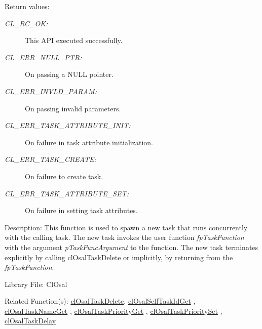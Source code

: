 \begin{Desc}
\item[Return values:]
\begin{description}
\item[{\em CL\_\-RC\_\-OK:}]This API executed successfully. \item[{\em CL\_\-ERR\_\-NULL\_\-PTR:}]On passing a NULL pointer. \item[{\em CL\_\-ERR\_\-INVLD\_\-PARAM:}]On passing invalid parameters. \item[{\em CL\_\-ERR\_\-TASK\_\-ATTRIBUTE\_\-INIT:}]On failure in task attribute initialization. \item[{\em CL\_\-ERR\_\-TASK\_\-CREATE:}]On failure to create task. \item[{\em CL\_\-ERR\_\-TASK\_\-ATTRIBUTE\_\-SET:}]On failure in setting task attributes.\end{description}
\end{Desc}
\begin{Desc}
\item[Description:]This function is used to spawn a new task that runs concurrently with the calling task. The new task invokes the user function {\em fp\-Task\-Function\/} with the argument {\em p\-Task\-Func\-Argument\/} to the function. The new task terminates explicitly by calling cl\-Osal\-Task\-Delete or implicitly, by returning from the {\em fp\-Task\-Function\/}.\end{Desc}
\begin{Desc}
\item[Library File:]Cl\-Osal\end{Desc}
\begin{Desc}
\item[Related Function(s):]\hyperlink{pageosal104}{cl\-Osal\-Task\-Delete}, \hyperlink{pageosal105}{cl\-Osal\-Self\-Task\-Id\-Get} , 
\hyperlink{pageosal106}{cl\-Osal\-Task\-Name\-Get} , \hyperlink{pageosal107}{cl\-Osal\-Task\-Priority\-Get} , 
\hyperlink{pageosal108}{cl\-Osal\-Task\-Priority\-Set} , \hyperlink{pageosal109}{cl\-Osal\-Task\-Delay} \end{Desc}

\newpage
